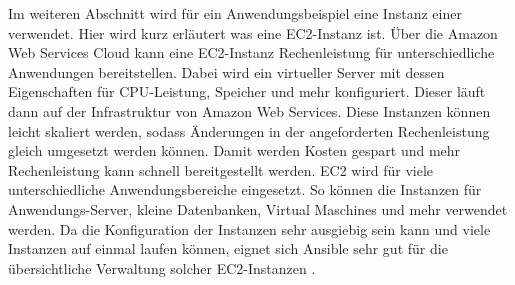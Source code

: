 \documentclass[biblatex]{lni}
\begin{document}
Im weiteren Abschnitt wird für ein Anwendungsbeispiel eine Instanz einer  verwendet. Hier wird kurz erläutert was eine EC2-Instanz ist. Über die Amazon Web Services Cloud kann eine EC2-Instanz Rechenleistung für unterschiedliche Anwendungen bereitstellen. Dabei wird ein virtueller Server mit dessen Eigenschaften für CPU-Leistung, Speicher und mehr konfiguriert. Dieser läuft dann auf der Infrastruktur von Amazon Web Services. Diese Instanzen können leicht skaliert werden, sodass Änderungen in der angeforderten Rechenleistung gleich umgesetzt werden können. Damit werden Kosten gespart und mehr Rechenleistung kann schnell bereitgestellt werden. EC2 wird für viele unterschiedliche Anwendungsbereiche eingesetzt. So können die Instanzen für Anwendungs-Server, kleine Datenbanken, Virtual Maschines und mehr verwendet werden. Da die Konfiguration der Instanzen sehr ausgiebig sein kann und viele Instanzen auf einmal laufen können, eignet sich Ansible sehr gut für die übersichtliche Verwaltung solcher EC2-Instanzen \cite{AmazonWebServices.2022}.

    
\end{document}
